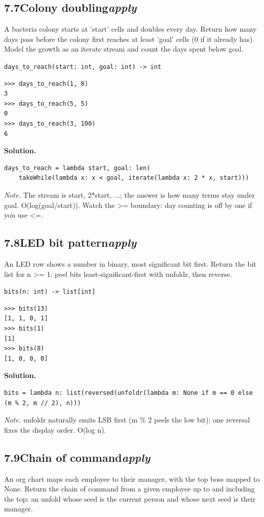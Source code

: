 \documentclass[10pt,letterpaper]{book}
\begin{document}
\subsection*{7.7\quad Colony doubling\hfill\textnormal{\textit{apply}}}
A bacteria colony starts at 'start' cells and doubles every day. Return how many days pass before the colony first reaches at least 'goal' cells (0 if it already has). Model the growth as an iterate stream and count the days spent below goal.

\noindent\texttt{days\_to\_reach(start: int, goal: int) -> int}
\begin{lstlisting}[style=ex]
>>> days_to_reach(1, 8)
3
>>> days_to_reach(5, 5)
0
>>> days_to_reach(3, 100)
6
\end{lstlisting}
\noindent\textbf{Solution.}
\begin{lstlisting}[style=code]
days_to_reach = lambda start, goal: len(
    takeWhile(lambda x: x < goal, iterate(lambda x: 2 * x, start)))
\end{lstlisting}
\noindent\textit{Note.} The stream is start, 2*start, ...; the answer is how many terms stay under goal. O(log(goal/start)). Watch the >= boundary: day counting is off by one if you use <=.


\subsection*{7.8\quad LED bit pattern\hfill\textnormal{\textit{apply}}}
An LED row shows a number in binary, most significant bit first. Return the bit list for n >= 1: peel bits least-significant-first with unfoldr, then reverse.

\noindent\texttt{bits(n: int) -> list[int]}
\begin{lstlisting}[style=ex]
>>> bits(13)
[1, 1, 0, 1]
>>> bits(1)
[1]
>>> bits(8)
[1, 0, 0, 0]
\end{lstlisting}
\noindent\textbf{Solution.}
\begin{lstlisting}[style=code]
bits = lambda n: list(reversed(unfoldr(lambda m: None if m == 0 else (m % 2, m // 2), n)))
\end{lstlisting}
\noindent\textit{Note.} unfoldr naturally emits LSB first (m \% 2 peels the low bit); one reversal fixes the display order. O(log n).

\subsection*{7.9\quad Chain of command\hfill\textnormal{\textit{apply}}}
An org chart maps each employee to their manager, with the top boss mapped to None. Return the chain of command from a given employee up to and including the top: an unfold whose seed is the current person and whose next seed is their manager.
\end{document}
